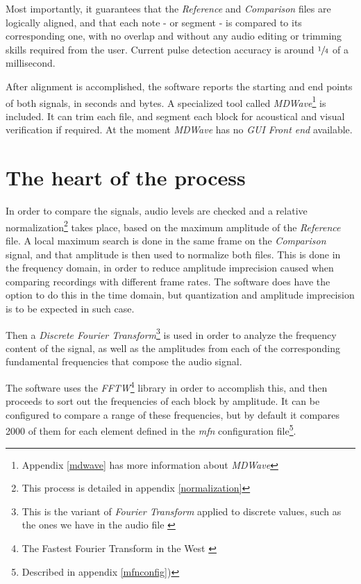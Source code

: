 \documentclass[10pt,a4paper]{report}
\begin{document}
Most importantly, it guarantees that the \textit{Reference} and \textit{Comparison} files are logically aligned, and that each note - or segment - is compared to its corresponding one, with no overlap and without any audio editing or trimming skills required from the user. Current pulse detection accuracy is around $\sfrac{1}{4}$ of a millisecond.

After alignment is accomplished, the software reports the starting and end points of both signals, in seconds and bytes. A specialized tool called \textit{MDWave}\footnote{Appendix \ref{mdwave} has more  information about \textit{MDWave}} is included. It can trim each file, and segment each block for acoustical and visual verification if required. At the moment \textit{MDWave} has no \textit{GUI Front end} available.  

\section{The heart of the process}

In order to compare the signals, audio levels are checked and a relative normalization\footnote{This process is detailed in appendix \ref{normalization}} takes place, based on the maximum amplitude of the \textit{Reference} file. A local maximum search is done in the same frame on the \textit{Comparison} signal, and that amplitude is then used to normalize both files. This is done in the frequency domain, in order to reduce amplitude imprecision caused when comparing recordings with different frame rates. The software does have the option to do this in the time domain, but quantization and amplitude imprecision is to be expected in such case.

Then a \textit{Discrete Fourier Transform}\footnote{This is the variant of \textit{Fourier Transform} applied to discrete values, such as the ones we have in the audio file \cite{FourierTransformApps}} is used in order to analyze the frequency content of the signal, as well as the amplitudes from each of the corresponding fundamental frequencies that compose the audio signal.

The software uses the \textit{FFTW}\footnote{The Fastest Fourier Transform in the West \cite{fftw}} library in order to accomplish this, and then proceeds to sort out the frequencies of each block by amplitude. It can be configured to compare a range of these frequencies, but by default it compares 2000 of them for each element defined in the \textit{mfn} configuration file\footnote{Described in appendix \ref{mfnconfig})}.
\end{document}
